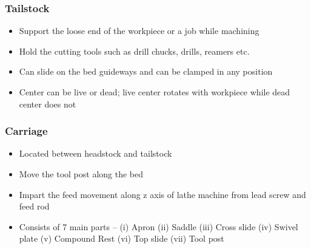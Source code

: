 \documentclass{article}
\begin{document}
\subsubsection*{Tailstock}
\begin{itemize}
  \item Support the loose end of the workpiece or a job 
  while machining
  \item Hold the cutting tools such as drill chucks, drills, 
  reamers etc.
  \item Can slide on the bed guideways and can be clamped 
  in any position
  \item Center can be live or dead; live center rotates with 
  workpiece while dead center does not
\end{itemize}

\subsubsection*{Carriage}
\begin{itemize}
  \item Located between headstock and tailstock 
  \item Move the tool post along the bed
  \item Impart the feed movement along z axis of 
  lathe machine from lead screw and feed rod
  \item Consists of 7 main parts – (i) Apron (ii) Saddle 
  (iii) Cross slide (iv) Swivel plate (v) Compound 
  Rest (vi) Top slide (vii) Tool post
\end{itemize}
\end{document}
